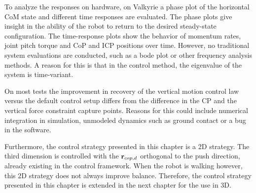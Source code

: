 To analyze the responses on hardware, on Valkyrie a phase plot of the horizontal \ac{CoM} state and different time responses are evaluated. The phase plots give insight in the ability of the robot to return to the desired steady-state configuration. The time-response plots show the behavior of momentum rates, joint pitch torque and \ac{CoP} and \ac{ICP} positions over time. However, no traditional system evaluations are conducted, such as a bode plot or other frequency analysis methods. A reason for this is that in the control method, the eigenvalue of the system is time-variant.

On most tests the improvement in recovery of the vertical motion control law versus the default control setup differs  from the difference in the \ac{CP} and the vertical force constraint capture points. Reasons for this could include numerical integration in simulation, unmodeled dynamics such as ground contact or a bug in the software.

Furthermore, the control strategy presented in this chapter is a \ac{2D} strategy. The third dimension is controlled with the $\mathbf{r}_{cop,d}$ orthogonal to the push direction, already existing in the control framework. When the robot is walking however, this \ac{2D} strategy does not always improve balance. Therefore, the control strategy presented in this chapter is extended in the next chapter for the use in \ac{3D}.



